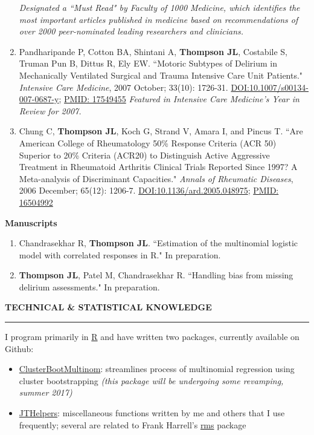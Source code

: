 \documentclass[5pt]{article}
\begin{document}
\begin{enumerate}
    \emph{Designated a ``Must Read" by Faculty of 1000 Medicine, which identifies the most important articles published in medicine based on recommendations of over 2000 peer-nominated leading researchers and clinicians.}
\item Pandharipande P, Cotton BA, Shintani A, \textbf{Thompson JL}, Costabile S, Truman Pun B, Dittus R, Ely EW. ``Motoric Subtypes of Delirium in Mechanically Ventilated Surgical and Trauma Intensive Care Unit Patients." \emph{Intensive Care Medicine}, 2007 October; 33(10): 1726-31. \href{https://doi.org/10.1007/s00134-007-0687-y}{DOI:10.1007/s00134-007-0687-y}; \href{https://www.ncbi.nlm.nih.gov/pubmed/17549455}{PMID: 17549455} \emph{Featured in Intensive Care Medicine's Year in Review for 2007.}
\item Chung C, \textbf{Thompson JL}, Koch G, Strand V, Amara I, and Pincus T. ``Are American College of Rheumatology 50\% Response Criteria (ACR 50) Superior to 20\% Criteria (ACR20) to Distinguish Active Aggressive Treatment in Rheumatoid Arthritis Clinical Trials Reported Since 1997? A Meta-analysis of Discriminant Capacities." \emph{Annals of Rheumatic Diseases}, 2006 December; 65(12): 1206-7. \href{https://doi.org/10.1136/ard.2005.048975}{DOI:10.1136/ard.2005.048975}; \href{https://www.ncbi.nlm.nih.gov/pubmed/16504992}{PMID: 16504992}
\end{enumerate}

\noindent \textbf{Manuscripts}
\begin{enumerate}
\item Chandrasekhar R, \textbf{Thompson JL}. ``Estimation of the multinomial logistic model with correlated responses in R." In preparation.
\item \textbf{Thompson JL}, Patel M, Chandrasekhar R. ``Handling bias from missing delirium assessments." In preparation.
\end{enumerate}

\noindent \linebreak \textbf{TECHNICAL \& STATISTICAL KNOWLEDGE}\\
\rule[5pt]{\linewidth}{1.0pt}
\noindent I program primarily in \href{http://www.r-project.org}{R} and have written two packages, currently available on Github:
\begin{itemize}
\item \href{https://github.com/jenniferthompson/ClusterBootMultinom}{ClusterBootMultinom}: streamlines process of multinomial regression using cluster bootstrapping \emph{(this package will be undergoing some revamping, summer 2017)}
\item \href{https://github.com/jenniferthompson/JTHelpers}{JTHelpers}: miscellaneous functions written by me and others that I use frequently; several are related to Frank Harrell's \href{https://cran.r-project.org/web/packages/rms/index.html}{rms} package
\end{itemize}
\end{document}
